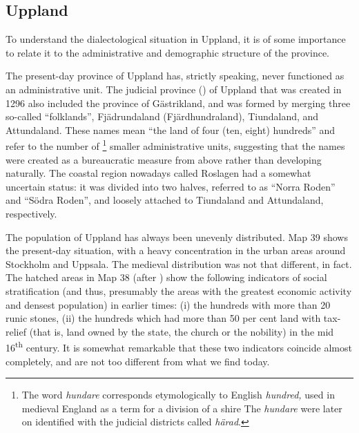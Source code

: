 \subsection{Uppland}

To understand the dialectological situation in Uppland, it is of some importance to relate it to the administrative and demographic structure of the province.



The present-day province of Uppland has, strictly speaking, never functioned as an administrative unit. The judicial province () of Uppland that was created in 1296 also included the province of Gästrikland, and was formed by merging three so-called “folklands”, Fjädrundaland (Fjärdhundraland), Tiundaland, and Attundaland. These names mean “the land of four (ten, eight) hundreds” and refer to the number of \textstyleLinguisticExample{,}\footnote{ The word \textit{hundare} corresponds etymologically to English \textit{hundred}\textit{,} used in medieval England as a term for a division of a shire The \textit{hundare} were later on identified with the judicial districts called \textit{härad}.} smaller administrative units, suggesting that the names were created as a bureaucratic measure from above rather than developing naturally. The coastal region nowadays called Roslagen had a somewhat uncertain status: it was divided into two halves, referred to as “Norra Roden” and “Södra Roden”, and loosely attached to Tiundaland and Attundaland, respectively. 




The population of Uppland has always been unevenly distributed. Map 39 shows the present-day situation, with a heavy concentration in the urban areas around Stockholm and Uppsala. The medieval distribution was not that different, in fact. The hatched areas in Map 38 (after \citet{Broberg1990}) show the following indicators of social stratification (and thus, presumably the areas with the greatest economic activity and densest population) in earlier times: (i) the hundreds with more than 20 runic stones, (ii) the hundreds which had more than 50 per cent land with tax-relief (that is, land owned by the state, the church or the nobility) in the mid 16\textsuperscript{th} century. It is somewhat remarkable that these two indicators coincide almost completely, and are not too different from what we find today. 




